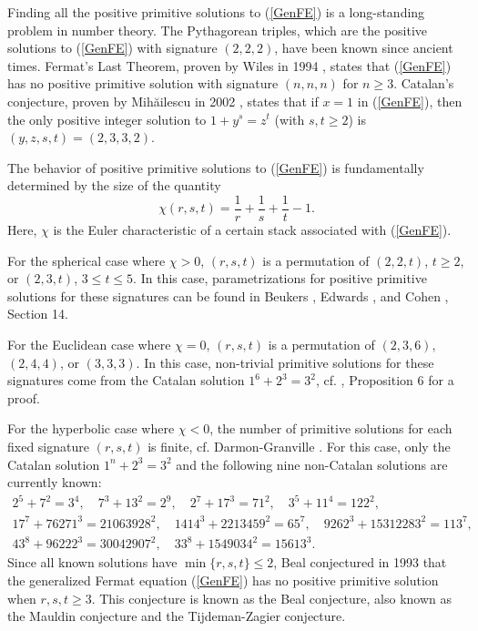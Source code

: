 \documentclass[a4paper, 12pt]{article}
\numberwithin{equation}{section}
\theoremstyle{definition}
\begin{document}
Finding all the positive primitive solutions to (\ref{GenFE}) is a long-standing problem in number theory. The Pythagorean triples, which are the positive solutions to (\ref{GenFE}) with signature $(2, 2, 2)$, have been known since ancient times. Fermat's Last Theorem, proven by Wiles in 1994 \cite{Wiles}, states that (\ref{GenFE}) has no positive primitive solution with signature $(n, n, n)$ for $n \ge 3$. Catalan's conjecture, proven by Mih\u{a}ilescu in 2002 \cite{Mihilescu2004PrimaryCU}, states that if $x = 1$ in (\ref{GenFE}), then the only positive integer solution to $1 + y^s = z^t$ (with $s, t \ge 2$) is $(y, z, s, t) = (2, 3, 3, 2)$.

The behavior of positive primitive solutions to (\ref{GenFE}) is fundamentally determined by the size of the quantity
\[
\chi(r, s, t) = \frac{1}{r} + \frac{1}{s} + \frac{1}{t} - 1.
\]
Here, $\chi$ is the Euler characteristic of a certain stack associated with (\ref{GenFE}).

For the spherical case where $\chi > 0$, $(r, s, t)$ is a permutation of $(2, 2, t)$, $t \ge 2$, or $(2, 3, t)$, $3 \le t \le 5$. In this case, parametrizations for positive primitive solutions for these signatures can be found in Beukers \cite{spherical_case1}, Edwards \cite{spherical_case2}, and Cohen \cite{Cohen-GTM240}, Section 14.

For the Euclidean case where $\chi = 0$, $(r, s, t)$ is a permutation of $(2, 3, 6)$, $(2, 4, 4)$, or $(3, 3, 3)$. In this case, non-trivial primitive solutions for these signatures come from the Catalan solution $1^6 + 2^3 = 3^2$, cf. \cite{Bennett-Chen-Dahmen-Yazdani}, Proposition 6 for a proof.

For the hyperbolic case where $\chi < 0$, the number of primitive solutions for each fixed signature $(r, s, t)$ is finite, cf. Darmon-Granville \cite{Darmon-Granville}. 
For this case, only the Catalan solution $1^n + 2^3 = 3^2$ and the following nine non-Catalan solutions are currently known:
\begin{gather*}
    2^5 + 7^2 = 3^4, \quad 7^3 + 13^2 = 2^9, \quad
    2^7 + 17^3 = 71^2, \quad 3^5 + 11^4 = 122^2, \\  
    17^7 + 76271^3 = 21063928^2, \quad	
    1414^3 + 2213459^2 = 65^7, \quad
    9262^3 + 15312283^2 = 113^7, \\ 
    43^8 + 96222^3 = 30042907^2, \quad 33^8 + 1549034^2 = 15613^3.
\end{gather*}
Since all known solutions have $\min\{r, s, t\} \le 2$, Beal conjectured in 1993 \cite{Beal_Conj} that the generalized Fermat equation (\ref{GenFE}) has no positive primitive solution when $r, s, t \ge 3$.
This conjecture is known as the Beal conjecture, also known as the Mauldin conjecture and the Tijdeman-Zagier conjecture.
\end{document}
